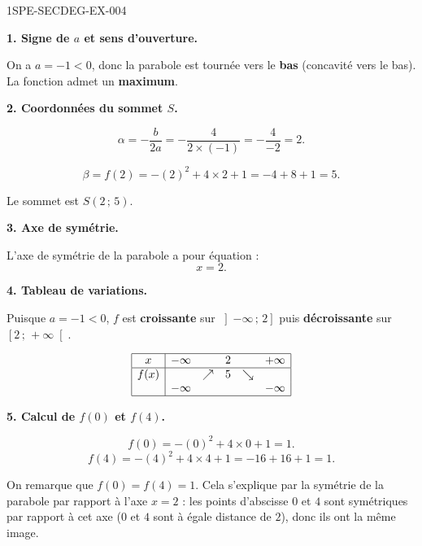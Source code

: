 \begin{corrige}{1SPE-SECDEG-EX-004}

\textbf{1. Signe de $a$ et sens d'ouverture.}


On a $a = -1 < 0$, donc la parabole est tournée vers le \textbf{bas} (concavité vers le bas). La fonction admet un \textbf{maximum}.

\medskip
\textbf{2. Coordonnées du sommet $S$.}


\[\alpha = -\frac{b}{2a} = -\frac{4}{2 \times (-1)} = -\frac{4}{-2} = 2.\]

\[\beta = f(2) = -(2)^2 + 4 \times 2 + 1 = -4 + 8 + 1 = 5.\]

Le sommet est $S(2\,;\,5)$.

\medskip
\textbf{3. Axe de symétrie.}


L'axe de symétrie de la parabole a pour équation :
\[\boxed{x = 2.}\]

\medskip
\textbf{4. Tableau de variations.}

Puisque $a = -1 < 0$, $f$ est \textbf{croissante} sur $\left]-\infty\,;\,2\right]$ puis \textbf{décroissante} sur $\left[2\,;\,+\infty\right[$.

\[
\begin{array}{|c|ccccc|}
\hline
x & -\infty & & 2 & & +\infty \\
\hline
f(x) & & \nearrow & 5 & \searrow & \\
 & -\infty & & & & -\infty \\
\hline
\end{array}
\]

\medskip
\textbf{5. Calcul de $f(0)$ et $f(4)$.}


\[f(0) = -(0)^2 + 4\times 0 + 1 = 1.\]
\[f(4) = -(4)^2 + 4\times 4 + 1 = -16 + 16 + 1 = 1.\]

On remarque que $f(0) = f(4) = 1$. Cela s'explique par la symétrie de la parabole par rapport à l'axe $x = 2$ : les points d'abscisse $0$ et $4$ sont symétriques par rapport à cet axe ($0$ et $4$ sont à égale distance de $2$), donc ils ont la même image.

\end{corrige}
